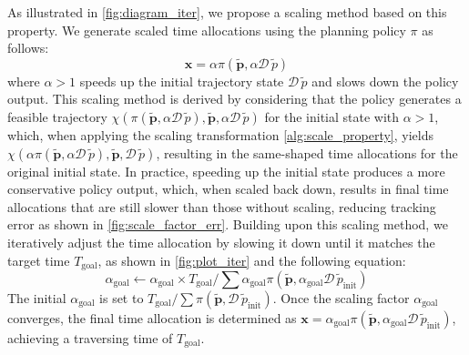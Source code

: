 As illustrated in \cref{fig:diagram_iter}, we propose a scaling method based on this property.
We generate scaled time allocations using the planning policy $\pi$ as follows:
\begin{equation}
    \mathbf{x} = \alpha \pi (\tilde{\mathbf{p}}, \alpha \mathcal{D\,} \tilde p)
\end{equation}
where $\alpha > 1$ speeds up the initial trajectory state $\mathcal{D\,} \tilde p$ and slows down the policy output.
This scaling method is derived by considering that the policy generates a feasible trajectory $\chi(\pi (\tilde{\mathbf{p}}, \alpha \mathcal{D\,} \tilde p), \tilde {\mathbf{p}}, \alpha \mathcal{D\,} \tilde p)$ for the initial state with $\alpha > 1$, which, when applying the scaling transformation \eqref{alg:scale_property}, yields $\chi(\alpha \pi (\tilde{\mathbf{p}}, \alpha \mathcal{D\,} \tilde p), \tilde {\mathbf{p}}, \mathcal{D\,} \tilde p)$, resulting in the same-shaped time allocations for the original initial state.
In practice, speeding up the initial state produces a more conservative policy output, which, when scaled back down, results in final time allocations that are still slower than those without scaling, reducing tracking error as shown in \cref{fig:scale_factor_err}.
Building upon this scaling method, we iteratively adjust the time allocation by slowing it down until it matches the target time $T_\text{goal}$, as shown in \cref{fig:plot_iter} and the following equation:
\begin{equation}
\alpha_\text{goal} \leftarrow \alpha_\text{goal} \times T_\text{goal} / \textstyle \sum \alpha_\text{goal} \pi (\tilde{\mathbf{p}}, \alpha_\text{goal} \mathcal{D\,} \tilde p_\text{init})
\end{equation}
The initial $\alpha_\text{goal}$ is set to $T_\text{goal} / \textstyle \sum \pi (\tilde{\mathbf{p}}, \mathcal{D\,} \tilde p_\text{init})$.
Once the scaling factor $\alpha_\text{goal}$ converges, the final time allocation is determined as $\mathbf{x} = \alpha_\text{goal} \pi (\tilde{\mathbf{p}}, \alpha_\text{goal} \mathcal{D\,}\tilde p_\text{init})$, achieving a traversing time of $T_\text{goal}$.

